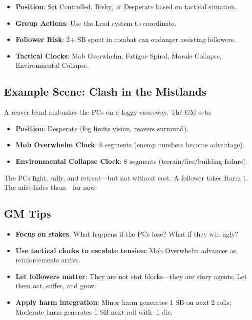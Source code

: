 \begin{itemize}
    \item \textbf{Position}: Set Controlled, Risky, or Desperate based on tactical situation.
    \item \textbf{Group Actions}: Use the Lead system to coordinate.
    \item \textbf{Follower Risk}: 2+ SB spent in combat can endanger assisting followers.
    \item \textbf{Tactical Clocks}: Mob Overwhelm, Fatigue Spiral, Morale Collapse, Environmental Collapse.
\end{itemize}

\subsection*{Example Scene: Clash in the Mistlands}

A reaver band ambushes the PCs on a foggy causeway. The GM sets:

\begin{itemize}
    \item \textbf{Position}: Desperate (fog limits vision, reavers surround).
    \item \textbf{Mob Overwhelm Clock}: 6 segments (enemy numbers become advantage).
    \item \textbf{Environmental Collapse Clock}: 8 segments (terrain/fire/building failure).
\end{itemize}

The PCs fight, rally, and retreat---but not without cost. A follower takes Harm 1. The mist hides them---for now.

\subsection*{GM Tips}

\begin{itemize}
    \item \textbf{Focus on stakes}: What happens if the PCs lose? What if they win ugly?
    \item \textbf{Use tactical clocks to escalate tension}: Mob Overwhelm advances as reinforcements arrive.
    \item \textbf{Let followers matter}: They are not stat blocks---they are story agents. Let them act, suffer, and grow.
    \item \textbf{Apply harm integration}: Minor harm generates 1 SB on next 2 rolls; Moderate harm generates 1 SB next roll with -1 die.
\end{itemize}

